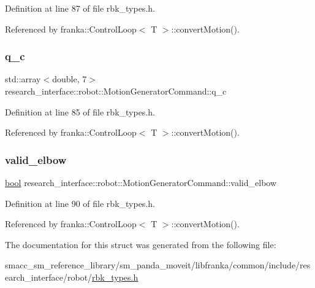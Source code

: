 Definition at line 87 of file rbk\+\_\+types.\+h.



Referenced by franka\+::\+Control\+Loop$<$ T $>$\+::convert\+Motion().

\mbox{\label{structresearch__interface_1_1robot_1_1MotionGeneratorCommand_aae29370603fa15690aeab4961aec0f36}} 
\subsubsection{\texorpdfstring{q\+\_\+c}{q\_c}}
{\footnotesize\ttfamily std\+::array$<$double, 7$>$ research\+\_\+interface\+::robot\+::\+Motion\+Generator\+Command\+::q\+\_\+c}



Definition at line 85 of file rbk\+\_\+types.\+h.



Referenced by franka\+::\+Control\+Loop$<$ T $>$\+::convert\+Motion().

\mbox{\label{structresearch__interface_1_1robot_1_1MotionGeneratorCommand_a1ad30cc0b7210a2d93914e3f98c0ef22}} 
\subsubsection{\texorpdfstring{valid\+\_\+elbow}{valid\_elbow}}
{\footnotesize\ttfamily \hyperlink{classbool}{bool} research\+\_\+interface\+::robot\+::\+Motion\+Generator\+Command\+::valid\+\_\+elbow}



Definition at line 90 of file rbk\+\_\+types.\+h.



Referenced by franka\+::\+Control\+Loop$<$ T $>$\+::convert\+Motion().



The documentation for this struct was generated from the following file\+:\begin{DoxyCompactItemize}
\item 
smacc\+\_\+sm\+\_\+reference\+\_\+library/sm\+\_\+panda\+\_\+moveit/libfranka/common/include/research\+\_\+interface/robot/\hyperlink{rbk__types_8h}{rbk\+\_\+types.\+h}\end{DoxyCompactItemize}
